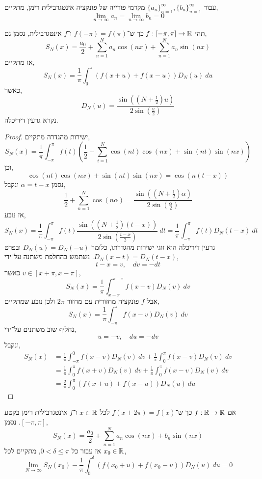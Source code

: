 \begin{conclusion}
	עבור ${\{ a_n \}}_{n = 1}^\infty, {\{ b_n \}}_{n = 1}^\infty$ מקדמי פורייה של פונקציה אינטגרבילית רימן, מתקיים,
	\[
		\lim_{n \to \infty} a_n
		= \lim_{n \to \infty} b_n
		= 0
	\]
\end{conclusion}
\begin{theorem}
	תהי $f : [-\pi, \pi] \to \mathbb{R}$ כך ש־$f(-\pi) = f(\pi)$ ו־$f$ אינטגרבילית,
	נסמן גם,
	\[
		S_N(x)
		= \frac{a_0}{2} + \sum_{n = 1}^N a_n \cos(n x) + \sum_{n = 1}^N a_n \sin(n x)
	\]
	אז מתקיים,
	\[
		S_N(x)
		= \frac{1}{\pi} \int_{0}^{\pi} (f(x + u) + f(x - u)) D_N(u)\ du
	\]
	כאשר,
	\[
		D_N(u)
		= \frac{\sin( (N + \frac{1}{2})u)}{2 \sin(\frac{u}{2})}
	\]
	נקרא גרעין דיריכלה.
\end{theorem}
\begin{proof}
	ישירות מהגדרה מתקיים,
	\[
		S_N(x)
		= \frac{1}{\pi} \int_{-\pi}^{\pi} f(t) \left( \frac{1}{2} + \sum_{i = 1}^N \cos(nt) \cos(nx) + \sin(nt) \sin(nx) \right)
	\]
	וכן,
	\[
		\cos(nt) \cos(nx) + \sin(nt) \sin(nx)
		= \cos(n(t - x))
	\]
	נסמן $\alpha = t - x$ ונקבל,
	\[
		\frac{1}{2} + \sum_{n = 1}^N \cos(n \alpha)
		= \frac{\sin((N + \frac{1}{2}) \alpha)}{2 \sin(\frac{\alpha}{2})}
	\]
	אז נובע,
	\[
		S_N(x)
		= \frac{1}{\pi} \int_{-\pi}^{\pi} f(t) \frac{\sin((N + \frac{1}{2}) (t - x))}{2 \sin(\frac{t - x}{2})}\ dt
		= \frac{1}{\pi} \int_{-\pi}^{\pi} f(t) D_N(t - x)\ dt
	\]
	גרעין דיריכלה הוא זוגי ישירות מהגדרתו, כלומר $D_N(u) = D_N(-u)$ ובפרט $D_N(x - t) = D_N(t - x)$.
	נשתמש בהחלפת משתנה על־ידי,
	\[
		t - x = v,
		\quad
		dv = -dt
	\]
	כאשר $v \in [x + \pi, x - \pi]$,
	\[
		S_N(x)
		= \frac{1}{\pi} \int_{x - \pi}^{x + \pi} f(x - v) D_N(v)\ dv
	\]
	אבל $f$ פונקציה מחזורית עם מחזור $2 \pi$ ולכן נובע שמתקיים,
	\[
		S_N(x)
		= \frac{1}{\pi} \int_{-\pi}^{\pi} f(x - v) D_N(v)\ dv
	\]
	נחליף שוב משתנים על־ידי,
	\[
		u = -v,
		\quad
		du = -dv
	\]
	ונקבל,
	\begin{align*}
		S_N(x)
		& = \frac{1}{\pi} \int_{-\pi}^{0} f(x - v) D_N(v)\ dv + \frac{1}{\pi} \int_{0}^{\pi} f(x - v) D_N(v)\ dv \\
		& = \frac{1}{\pi} \int_{0}^{\pi} f(x + v) D_N(v)\ dv + \frac{1}{\pi} \int_{0}^{\pi} f(x - v) D_N(v)\ dv \\
		& = \frac{2}{\pi} \int_{0}^{\pi} (f(x + u) + f(x - u)) D_N(u)\ du
	\end{align*}
\end{proof}
\begin{theorem}
	אם $f : \mathbb{R} \to \mathbb{R}$ כך ש־$f(x + 2 \pi) = f(x)$ לכל $x \in \mathbb{R}$ ו־$f$ אינטגרבילית רימן בקטע $[-\pi, \pi]$.
	נסמן,
	\[
		S_N(x)
		= \frac{a_0}{2} + \sum_{n = 1}^N a_n \cos(nx) + b_n \sin(nx)
	\]
	אז עבור כל $0 < \delta \le \pi$, מתקיים לכל $x_0 \in \mathbb{R}$,
	\[
		\lim_{N \to \infty} S_N(x_0) - \frac{1}{\pi} \int_{0}^{\delta} (f(x_0 + u) + f(x_0 - u)) D_N(u)\ du = 0
	\]
\end{theorem}
